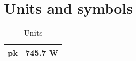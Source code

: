 \chapter{Units and symbols}

\begin{table}[h]
	\centering
	\begin{tabular}{|c|c|}
		\hline
		pk&745.7 W\\
		\hline
	\end{tabular}
	\caption{Units}
\end{table}